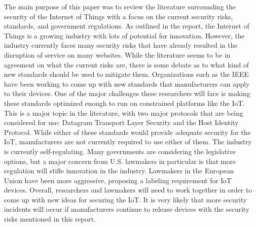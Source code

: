 \documentclass[letterpaper, 12pt]{article}
\begin{document}
\begin{flushleft}
The main purpose of this paper was to review the literature surrounding the security of the Internet of Things with a focus on the current security risks,
standards, and government regulations. As outlined in the report, the Internet of Things is a growing industry with lots of potential for innovation. 
However, the industry currently faces many security risks that have already resulted in the disruption of service on many websites. While the literature
seems to be in agreement on what the current risks are, there is some debate as to what kind of new standards should be used to mitigate them. Organizations
such as the IEEE have been working to come up with new standards that manufacturers can apply to their devices. One of the major challenges these researchers
will face is making these standards optimized enough to run on constrained platforms like the IoT. This is a major topic in the literature, with two major 
protocols that are being considered for use: Datagram Transport Layer Security and the Host Identity Protocol. While either of these standards would provide
adequate security for the IoT, manufacturers are not currently required to use either of them. The industry is currently self-regulating. Many governments
are considering the legislative options, but a major concern from U.S. lawmakers in particular is that more regulation will stifle innovation in the industry. 
Lawmakers in the European Union have been more aggressive, proposing a labeling requirement for IoT devices. Overall, researchers and lawmakers will need to
work together in order to come up with new ideas for securing the IoT. It is very likely that more security incidents will occur if manufacturers continue
to release devices with the security risks mentioned in this report. 
\newpage
{}
\printbibliography
\end{flushleft}
\end{document}
